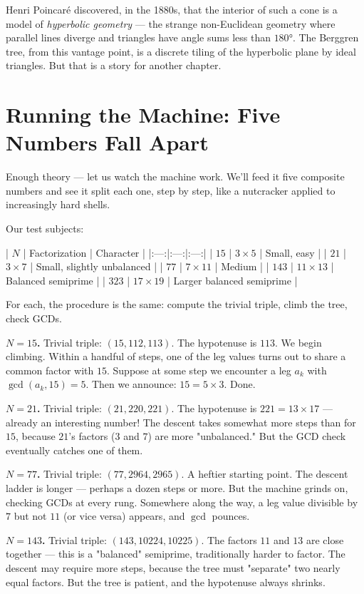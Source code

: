 \documentclass[11pt,twoside,openright]{book}
\theoremstyle{definition}
\theoremstyle{remark}
\begin{document}
Henri Poincar\'e discovered, in the 1880s, that the interior of such a cone is a model of \textit{hyperbolic geometry} --- the strange non-Euclidean geometry where parallel lines diverge and triangles have angle sums less than $180°$. The Berggren tree, from this vantage point, is a discrete tiling of the hyperbolic plane by ideal triangles. But that is a story for another chapter.



\section{Running the Machine: Five Numbers Fall Apart}

Enough theory --- let us watch the machine work. We'll feed it five composite numbers and see it split each one, step by step, like a nutcracker applied to increasingly hard shells.

Our test subjects:

| $N$ | Factorization | Character |
|:---:|:---:|:---:|
| $15$ | $3 \times 5$ | Small, easy |
| $21$ | $3 \times 7$ | Small, slightly unbalanced |
| $77$ | $7 \times 11$ | Medium |
| $143$ | $11 \times 13$ | Balanced semiprime |
| $323$ | $17 \times 19$ | Larger balanced semiprime |

For each, the procedure is the same: compute the trivial triple, climb the tree, check GCDs.

\textbf{$N = 15$.}
Trivial triple: $(15, 112, 113)$. The hypotenuse is $113$. We begin climbing. Within a handful of steps, one of the leg values turns out to share a common factor with $15$. Suppose at some step we encounter a leg $a_k$ with $\gcd(a_k, 15) = 5$. Then we announce: $15 = 5 \times 3$. Done.

\textbf{$N = 21$.}
Trivial triple: $(21, 220, 221)$. The hypotenuse is $221 = 13 \times 17$ --- already an interesting number! The descent takes somewhat more steps than for $15$, because $21$'s factors ($3$ and $7$) are more "unbalanced." But the GCD check eventually catches one of them.

\textbf{$N = 77$.}
Trivial triple: $(77, 2964, 2965)$. A heftier starting point. The descent ladder is longer --- perhaps a dozen steps or more. But the machine grinds on, checking GCDs at every rung. Somewhere along the way, a leg value divisible by $7$ but not $11$ (or vice versa) appears, and $\gcd$ pounces.

\textbf{$N = 143$.}
Trivial triple: $(143, 10224, 10225)$. The factors $11$ and $13$ are close together --- this is a "balanced" semiprime, traditionally harder to factor. The descent may require more steps, because the tree must "separate" two nearly equal factors. But the tree is patient, and the hypotenuse always shrinks.
\end{document}
